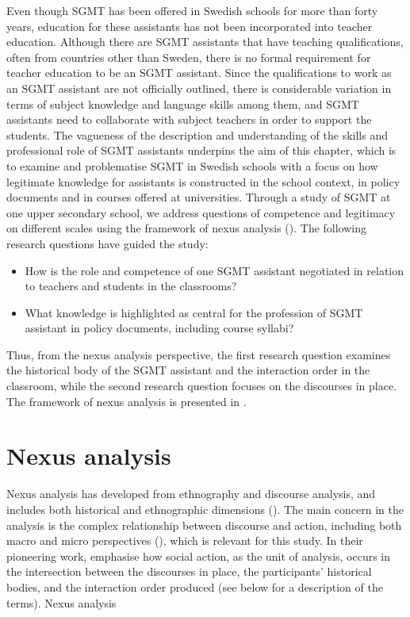 \documentclass[output=paper]{langscibook}
\begin{document}
Even though SGMT has been offered in Swedish schools for more than forty years, education for these assistants has not been incorporated into teacher education. Although there are SGMT assistants that have teaching qualifications, often from countries other than Sweden, there is no formal requirement for teacher education to be an SGMT assistant. Since the qualifications to work as an SGMT assistant are not officially outlined, there is considerable variation in terms of subject knowledge and language skills among them, and SGMT assistants need to collaborate with subject teachers in order to support the students. The vagueness of the description and understanding of the skills and professional role of SGMT assistants underpins the aim of this chapter, which is to examine and problematise SGMT in Swedish schools with a focus on how legitimate knowledge for assistants is constructed in the school context, in policy documents and in courses offered at universities. Through a study of SGMT at one upper secondary school, we address questions of competence and legitimacy on different scales using the framework of nexus analysis (\citealt{ScollonScollon2004, ScollonScollon2007}). The following research questions have guided the study:

\begin{itemize}
\item How is the role and competence of one SGMT assistant negotiated in relation to teachers and students in the classrooms?
\item What knowledge is highlighted as central for the profession of SGMT assistant in policy documents, including course syllabi?
\end{itemize}

Thus, from the nexus analysis perspective, the first research question examines the historical body of the SGMT assistant and the interaction order in the classroom, while the second research question focuses on the discourses in place. The framework of nexus analysis is presented in .

\section{Nexus analysis} \label{sec:rosen:2}

Nexus analysis has developed from ethnography and discourse analysis, and includes both historical and ethnographic dimensions (\citealt{Hult2010, Pietikainen2011}). The main concern in the analysis is the complex relationship between discourse and action, including both macro and micro perspectives (\citealt{Lane2014}), which is relevant for this study. In their pioneering work, \citet{ScollonScollon2004} emphasise how social action, as the unit of analysis, occurs in the intersection between the discourses in place, the participants’ historical bodies, and the interaction order produced (see below for a description of the terms). Nexus analysis
\end{document}
